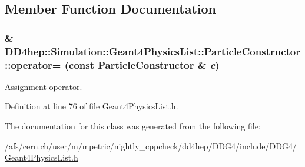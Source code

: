 \subsection{Member Function Documentation}
\hypertarget{class_d_d4hep_1_1_simulation_1_1_geant4_physics_list_1_1_particle_constructor_a54d456bf5a4f13eeedeaefd879f4f1c8}{
\subsubsection[{operator=}]{\& DD4hep::Simulation::Geant4PhysicsList::ParticleConstructor::operator= (const {\bf ParticleConstructor} \& {\em c})}}
\label{class_d_d4hep_1_1_simulation_1_1_geant4_physics_list_1_1_particle_constructor_a54d456bf5a4f13eeedeaefd879f4f1c8}


Assignment operator. 

Definition at line 76 of file Geant4PhysicsList.h.

The documentation for this class was generated from the following file:\begin{DoxyCompactItemize}
\item 
/afs/cern.ch/user/m/mpetric/nightly\_\-cppcheck/dd4hep/DDG4/include/DDG4/\hyperlink{_geant4_physics_list_8h}{Geant4PhysicsList.h}\end{DoxyCompactItemize}
